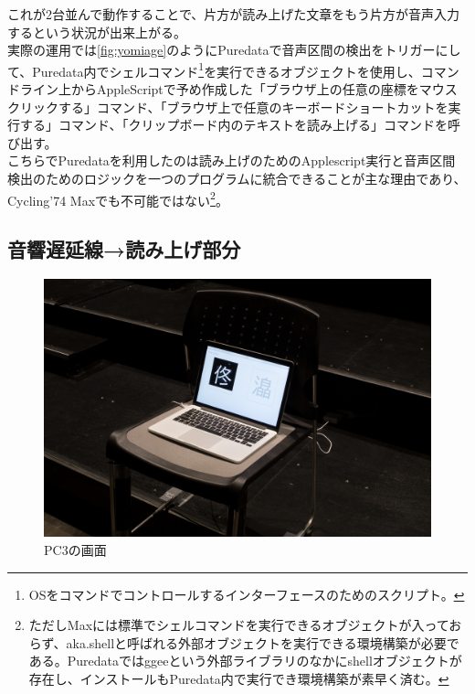 \documentclass[a4paper,report]{jsbook}
\begin{document}
これが2台並んで動作することで、片方が読み上げた文章をもう片方が音声入力するという状況が出来上がる。\\
実際の運用では\cref{fig:yomiage}のようにPuredataで音声区間の検出をトリガーにして、Puredata内でシェルコマンド\footnote{OSをコマンドでコントロールするインターフェースのためのスクリプト。}を実行できるオブジェクトを使用し、コマンドライン上からAppleScriptで予め作成した「ブラウザ上の任意の座標をマウスクリックする」コマンド、「ブラウザ上で任意のキーボードショートカットを実行する」コマンド、「クリップボード内のテキストを読み上げる」コマンドを呼び出す。\\
こちらでPuredataを利用したのは読み上げのためのApplescript実行と音声区間検出のためのロジックを一つのプログラムに統合できることが主な理由であり、Cycling'74
Maxでも不可能ではない\footnote{ただしMaxには標準でシェルコマンドを実行できるオブジェクトが入っておらず、aka.shellと呼ばれる外部オブジェクトを実行できる環境構築が必要である。Puredataではggeeという外部ライブラリのなかにshellオブジェクトが存在し、インストールもPuredata内で実行でき環境構築が素早く済む。}。

\subsection{音響遅延線→読み上げ部分}\label{ux97f3ux97ffux9045ux5ef6ux7ddaux8aadux307fux4e0aux3052ux90e8ux5206}

\begin{no-prefix-figure-caption}

\begin{figure}[htbp]
\centering
\includegraphics[width=1.00000\textwidth]{./img/adm2_archive5.jpg}
\caption{PC3の画面}
\end{figure}

\end{no-prefix-figure-caption}
\end{document}
